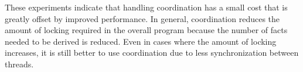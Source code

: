 These experiments indicate that handling coordination has a small cost that is
greatly offset by improved performance. In general, coordination reduces the
amount of locking required in the overall program because the number of facts
needed to be derived is reduced. Even in cases where the amount of locking
increases, it is still better to use coordination due to less synchronization
between threads.
